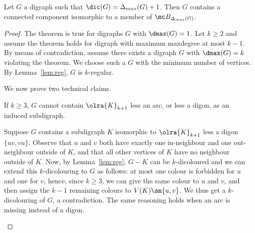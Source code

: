 \begin{theorem}
Let $G$ a digraph such that $\dic(G) = \Delta_{max}(G) + 1$. Then $G$ contains a connected component isomorphic to a member of $\mc B_{\Delta_{max}(G)}$. 
\end{theorem}
\begin{proof}
The theorem is true for digraphs $G$ with $\dmax(G) = 1$. Let $k \geq 2$ and assume the theorem holds for digraph with maximum maxdegree at most $k-1$. By means of contradiction, assume there exists a digraph $G$ with $\dmax(G) = k$ violating the theorem. 
We choose such a $G$ with the minimum number of vertices. 
By Lemma~\ref{lem:reg}, $G$ is $k$-regular. 

We now prove two technical claims. 

\begin{claim}
If $k \geq 3$, $G$ cannot contain $\olra{K}_{k+1}$ less an arc, or less a digon, as an induced subdigraph. 
\end{claim}

\begin{proofclaim}
Suppose $G$ contains a subdigraph $K$ isomorphic to $\olra{K}_{k + 1}$ less a digon $\{uv,vu\}$.  
Observe that $u$ and $v$ both have exactly one in-neighbour and one out-neighbour outside of $K$, and that all other vertices of $K$ have no neighbour outside of $K$. Now, by Lemma~\ref{lem:reg}, $G - K$ can be $k$-dicoloured and we can extend this $k$-dicolouring to $G$ as follows: at most one colour is forbidden for $u$ and one for $v$, hence, since $k \geq 3$, we can give the same colour to $u$ and $v$, and then assign the $k-1$ remaining colours to $V(K)\sm \{u,v\}$. We thus get a $k$-dicolouring of $G$, a contradiction.  The same reasoning holds when an arc is missing instead of a digon. 
\end{proofclaim}


\end{proof}
